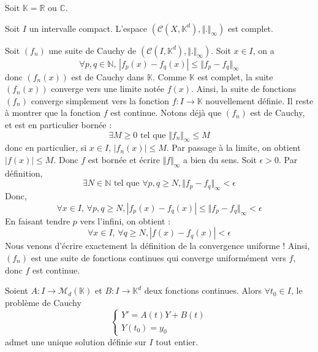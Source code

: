 



	
	Soit $\mathbb{K} = \mathbb{R}$ ou $\mathbb{C}$.
	
	\begin{lemma}
		Soit $I$ un intervalle compact. L'espace $(\mathcal{C} (X, \mathbb{K}^d), \Vert . \Vert_{\infty})$ est complet.
	\end{lemma}

	\begin{demonstration}
		Soit $(f_n)$ une suite de Cauchy de $(\mathcal{C} (I, \mathbb{K}^d), \Vert . \Vert_{\infty})$. Soit $x \in I$, on a
		\[ \forall p, q \in \mathbb{N}, \, |f_p(x) - f_q(x)| \leq \Vert f_p - f_q \Vert_\infty \]
		donc $(f_n(x))$ est de Cauchy dans $\mathbb{K}$. Comme $\mathbb{K}$ est complet, la suite $(f_n(x))$ converge vers une limite notée $f(x)$. Ainsi, la suite de fonctions $(f_n)$ converge simplement vers la fonction $f : I \rightarrow \mathbb{K}$ nouvellement définie. Il reste à montrer que la fonction $f$ est continue.
		\newpar
		Notons déjà que $(f_n)$ est de Cauchy, et est en particulier bornée :
		\[ \exists M \geq 0 \text{ tel que } \Vert f_n \Vert_\infty \leq M \]
		donc en particulier, si $x \in I$, $|f_n(x)| \leq M$. Par passage à la limite, on obtient $|f(x)| \leq M$. Donc $f$ est bornée et écrire $\Vert f \Vert_{\infty}$ a bien du sens.
		\newpar
		Soit $\epsilon > 0$. Par définition,
		\[ \exists N \in \mathbb{N} \text{ tel que } \forall p, q \geq N, \Vert f_p - f_q \Vert_\infty < \epsilon \]
		Donc,
		\[ \forall x \in I, \, \forall p, q \geq N, |f_p(x) - f_q(x)| \leq \Vert f_p - f_q \Vert_\infty < \epsilon \]
		En faisant tendre $p$ vers l'infini, on obtient :
		\[ \forall x \in I, \, \forall q \geq N, |f(x) - f_q(x)| < \epsilon \]
		Nous venons d'écrire exactement la définition de la convergence uniforme ! Ainsi, $(f_n)$ est une suite de fonctions continues qui converge uniformément vers $f$, donc $f$ est continue.
	\end{demonstration}
	
	
	\begin{theorem}
		Soient $A : I \rightarrow \mathcal{M}_d(\mathbb{K})$ et $B : I \rightarrow \mathbb{K}^d$ deux fonctions continues. Alors $\forall t_0 \in I$, le problème de Cauchy
		\[ \begin{cases} Y' = A(t)Y + B(t) \\ Y(t_0) = y_0 \end{cases} \tag{$C$} \]
		admet une unique solution définie sur $I$ tout entier.
	\end{theorem}

